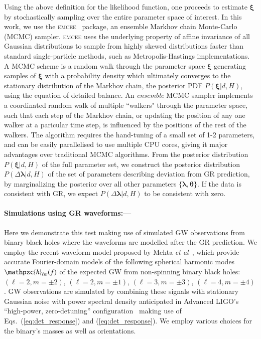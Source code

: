 \documentclass[prl,preprintnumbers,twocolumn,eqsecnum,floatfix,a4paper,nofootinbib,superscriptaddress]{revtex4}
\newcommand{\h}{\mathpzc{h}}
\newcommand{\blambda}{\bm{\lambda}}
\newcommand{\btheta}{\bm{\theta}}
\newcommand{\bxi}{\bm{\xi}}
\newcommand{\etal}{\emph{et al}}
\begin{document}
Using the above definition for the likelihood function, one proceeds to estimate $\bxi$ by stochastically sampling over the entire parameter space of interest. In this work, we use the \textsc{emcee}~\cite{goodman2010ensemble,foreman2013emcee} package, an ensemble Markhov chain Monte-Carlo (MCMC) sampler. \textsc{emcee} uses the underlying property of affine invariance of all Gaussian distributions to sample from highly skewed distributions faster than standard single-particle methods, such as Metropolis-Hastings implementations. A MCMC scheme is a random walk through the parameter space $\bxi$ generating samples of $\bxi$ with a probability density which ultimately converges to the stationary distribution of the Markhov chain, the posterior PDF $P(\bxi|d, H)$, using the equation of detailed balance. An \emph{ensemble} MCMC sampler implements a coordinated random walk of multiple ``walkers" through the parameter space, such that each step of the Markhov chain, or updating the position of any one walker at a paricular time step, is influenced by the positions of the rest of the walkers. The algorithm requires the hand-tuning of a small set of 1-2 parameters, and can be easily parallelised to use multiple CPU cores, giving it major advantages over traditional MCMC algorithms. From the posterior distribution $P(\bxi | d, H)$ of the full parameter set, we construct the posterior distribution $P(\Delta \blambda | d, H)$ of the set of parameters describing deviation from GR prediction, by marginalizing the posterior over all other parameters $\{\blambda, \btheta\}$. If the data is consistent with GR, we expect $P(\Delta \blambda | d, H)$ to be consistent with zero. 

\paragraph{Simulations using GR waveforms:---}
Here we demonstrate this test making use of simulated GW observations from binary black holes where the waveforms are modelled after the GR prediction. We employ the recent waveform model proposed by Mehta \etal~\cite{Mehta:2017jpq}, which provide accurate Fourier-domain models of the following spherical harmonic modes $\h_{\ell m}(f)$ of the expected GW from non-spinning binary black holes: $(\ell = 2, m = \pm2)$, $(\ell = 2, m=\pm1)$, $(\ell = 3, m=\pm3)$, $(\ell = 4, m = \pm4)$. GW observations are simulated by combining these signals with stationary Gaussian noise with power spectral density anticipated in Advanced LIGO's ``high-power, zero-detuning'' configuration~\cite{aLIGOZeroDetHighPower} making use of Eqs.~(\ref{eq:det_response}) and (\ref{eq:det_response}). We employ various choices for the binary's masses as well as orientations. 
 
\end{document}
